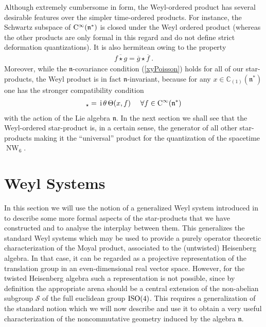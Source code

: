 \documentclass[11pt,a4paper]{article}
\DeclareMathOperator{\NW}{NW}
\newcommand{\1}{\mathbb{1}}
\def\ii{{\,{\rm i}\,}}
\def\CC{{\rm C}}
\def\mfn{{\mathfrak n}}
\newcommand{\newsection}{\setcounter{equation}{0}\section}
\newcommand{\complex}{{\mathbb C}} %
\newcommand{\beq}{\begin{eqnarray}}
\newcommand{\eeq}{\end{eqnarray}}
\begin{document}
Although extremely cumbersome in form, the Weyl-ordered product has
several desirable features over the simpler time-ordered products. For
instance, the Schwartz subspace of $\CC^\infty(\mfn^*)$ is closed
under the Weyl ordered product (whereas the other products are only
formal in this regard and do not define strict deformation
quantizations). It is also hermitean owing to the property
\beq
\overline{f\star g}=\overline{g}\star\overline{f} \ .
\label{Weylstarherm}\eeq
Moreover, while the $\mfn$-covariance condition (\ref{xyPoisson})
holds for all of our star-products, the Weyl product is in fact
$\mfn$-invariant, because for any $x\in\complex_{(1)}(\mfn^*)$ one
has the stronger compatibility condition
\beq
[x,f]_\star=\ii\theta\,\Theta(x,f) ~~~~ \forall f\in\CC^\infty(\mfn^*)
\label{strongcompcond}\eeq
with the action of the Lie algebra $\mfn$. In the next
section we shall see that the Weyl-ordered star-product is, in a
certain sense, the generator of all other star-products making it the
``universal'' product for the quantization of the spacetime $\NW_6$.

\newsection{Weyl Systems\label{WeylSystems}}

In this section we will use the notion of a generalized Weyl system
introduced in~\cite{ALZ1} to describe some more formal aspects of the
star-products that we have constructed and to analyse the interplay
between them. This generalizes the standard Weyl systems which may be
used to provide a purely operator theoretic characterization of the
Moyal product, associated to the (untwisted) Heisenberg algebra. In
that case, it can be regarded as a projective representation of the
translation group in an even-dimensional real vector space. However,
for the twisted Heisenberg algebra such a representation is not
possible, since by definition the appropriate arena should be a
central extension of the non-abelian subgroup $\mathcal S$ of
the full euclidean group ${\rm ISO}(4)$. This requires a
generalization of the standard notion which we will now describe and
use it to obtain a very useful characterization of the noncommutative
geometry induced by the algebra $\mfn$.
\end{document}

